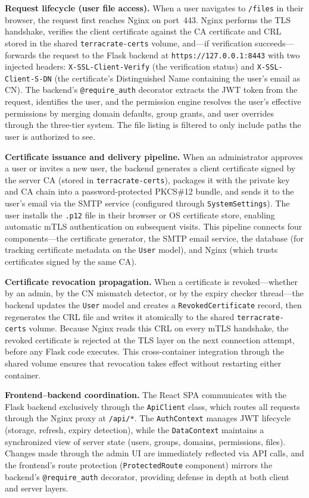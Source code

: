 \documentclass[12pt,letterpaper]{report}
\begin{document}
\textbf{Request lifecycle (user file access).} When a user navigates to \texttt{/files} in their browser, the request first reaches Nginx on port~443. Nginx performs the TLS handshake, verifies the client certificate against the CA certificate and CRL stored in the shared \texttt{terracrate-certs} volume, and---if verification succeeds---forwards the request to the Flask backend at \texttt{https://127.0.0.1:8443} with two injected headers: \texttt{X-SSL-Client-Verify} (the verification status) and \texttt{X-SSL-Client-S-DN} (the certificate's Distinguished Name containing the user's email as CN). The backend's \texttt{@require\_auth} decorator extracts the JWT token from the request, identifies the user, and the permission engine resolves the user's effective permissions by merging domain defaults, group grants, and user overrides through the three-tier system. The file listing is filtered to only include paths the user is authorized to see.

\textbf{Certificate issuance and delivery pipeline.} When an administrator approves a user or invites a new user, the backend generates a client certificate signed by the server CA (stored in \texttt{terracrate-certs}), packages it with the private key and CA chain into a password-protected PKCS\#12 bundle, and sends it to the user's email via the SMTP service (configured through \texttt{SystemSettings}). The user installs the \texttt{.p12} file in their browser or OS certificate store, enabling automatic mTLS authentication on subsequent visits. This pipeline connects four components---the certificate generator, the SMTP email service, the database (for tracking certificate metadata on the \texttt{User} model), and Nginx (which trusts certificates signed by the same CA).

\textbf{Certificate revocation propagation.} When a certificate is revoked---whether by an admin, by the CN mismatch detector, or by the expiry checker thread---the backend updates the \texttt{User} model and creates a \texttt{RevokedCertificate} record, then regenerates the CRL file and writes it atomically to the shared \texttt{terracrate-certs} volume. Because Nginx reads this CRL on every mTLS handshake, the revoked certificate is rejected at the TLS layer on the next connection attempt, before any Flask code executes. This cross-container integration through the shared volume ensures that revocation takes effect without restarting either container.

\textbf{Frontend--backend coordination.} The React SPA communicates with the Flask backend exclusively through the \texttt{ApiClient} class, which routes all requests through the Nginx proxy at \texttt{/api/*}. The \texttt{AuthContext} manages JWT lifecycle (storage, refresh, expiry detection), while the \texttt{DataContext} maintains a synchronized view of server state (users, groups, domains, permissions, files). Changes made through the admin UI are immediately reflected via API calls, and the frontend's route protection (\texttt{ProtectedRoute} component) mirrors the backend's \texttt{@require\_auth} decorator, providing defense in depth at both client and server layers.
\end{document}
